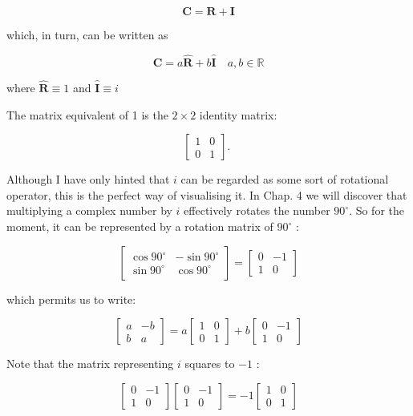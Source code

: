 $$
\mathbf{C}=\mathbf{R}+\mathbf{I}
$$

which, in turn, can be written as

$$
\mathbf{C}=a \hat{\mathbf{R}}+b \hat{\mathbf{I}} \quad a, b \in \mathbb{R}
$$

where $\hat{\mathbf{R}} \equiv 1$ and $\hat{\mathbf{I}} \equiv i$

The matrix equivalent of 1 is the $2 \times 2$ identity matrix:

$$
\left[\begin{array}{ll}
1 & 0 \\
0 & 1
\end{array}\right] \text {. }
$$

Although I have only hinted that $i$ can be regarded as some sort of rotational operator, this is the perfect way of visualising it. In Chap. 4 we will discover that multiplying a complex number by $i$ effectively rotates the number $90^{\circ}$. So for the moment, it can be represented by a rotation matrix of $90^{\circ}$ :

$$
\left[\begin{array}{cc}
\cos 90^{\circ} & -\sin 90^{\circ} \\
\sin 90^{\circ} & \cos 90^{\circ}
\end{array}\right]=\left[\begin{array}{cc}
0 & -1 \\
1 & 0
\end{array}\right]
$$

which permits us to write:

$$
\left[\begin{array}{cc}
a & -b \\
b & a
\end{array}\right]=a\left[\begin{array}{ll}
1 & 0 \\
0 & 1
\end{array}\right]+b\left[\begin{array}{cc}
0 & -1 \\
1 & 0
\end{array}\right]
$$

Note that the matrix representing $i$ squares to $-1$ :

$$
\left[\begin{array}{cc}
0 & -1 \\
1 & 0
\end{array}\right]\left[\begin{array}{cc}
0 & -1 \\
1 & 0
\end{array}\right]=-1\left[\begin{array}{ll}
1 & 0 \\
0 & 1
\end{array}\right]
$$


